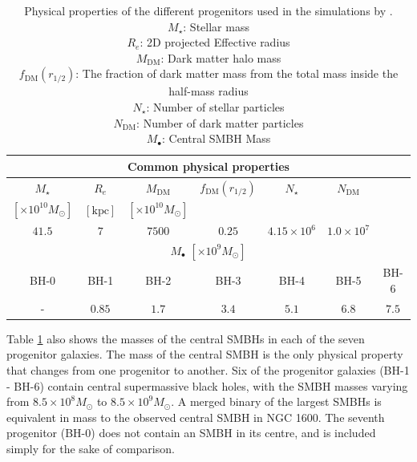 \documentclass[english, oneside]{HYgradu}
\begin{document}
\begin{table}
	\begin{center}
		\begin{tabular}{| c c c c c c c |}
		\hline
		\multicolumn{7}{|c|}{Common physical properties} \\
		\hline
		$M_\star$ & $R_e$ & $M_\mathrm{DM}$ & $f_\mathrm{DM}(r_{1/2})$ & $N_\star$ & $N_\mathrm{DM}$ & \\
		$[\times 10^{10} M_\odot]$ & $\mathrm{[kpc]}$ & $[\times 10^{10} M_\odot]$ & & & & \\
		$41.5$ & $7$ & $7500$ & $0.25$ & $4.15 \times 10^6$ & $1.0 \times 10^7$ & \\
		\hline
		\hline
		\multicolumn{7}{|c|}{$M_\bullet$ $[\times10^{9} M_\odot]$} \\
		\hline
		BH-0 & BH-1 & BH-2 & BH-3 & BH-4 & BH-5 & BH-6 \\
		- & $0.85$ & $1.7$ & $3.4$ & $5.1$ & $6.8$ & $7.5$ \\
		\hline
		\end{tabular}
	\end{center}
	\caption{Physical properties of the different progenitors used in the simulations by \cite{Rantala2018}. \\
	$M_\star$: Stellar mass \\
	$R_e$: 2D projected Effective radius \\
	$M_\mathrm{DM}$: Dark matter halo mass \\
	$f_\mathrm{DM}(r_{1/2})$: The fraction of dark matter mass from the total mass inside the half-mass radius \\
	$N_\star$: Number of stellar particles \\
	$N_\mathrm{DM}$: Number of dark matter particles \\
	$M_\bullet$: Central SMBH Mass}
	\label{table:properties}
\end{table}

Table \ref{table:properties} also shows the masses of the central SMBHs in each of the seven progenitor galaxies. The mass of the central SMBH is the only physical property that changes from one progenitor to another. Six of the progenitor galaxies (BH-1 - BH-6) contain central supermassive black holes, with the SMBH masses varying from $8.5 \times 10^8 M_\odot$ to $8.5 \times 10^9 M_\odot$. A merged binary of the largest SMBHs is equivalent in mass to the observed central SMBH in NGC 1600. The seventh progenitor (BH-0) does not contain an SMBH in its centre, and is included simply for the sake of comparison.
\end{document}
